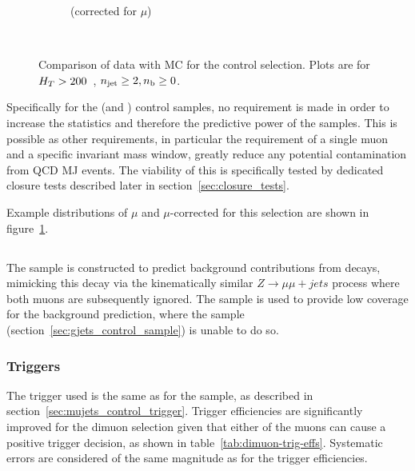 \begin{figure}[t]
\begin{subfigure}[b]{0.48\textwidth}
      \caption{\met (corrected for $\mu$)}
    \end{subfigure} \\
    \caption{\label{fig:datamc_mu_inc}
    Comparison of data with MC for the \mj control selection. Plots 
    are for $H_T>200$~\gev, $n_{\text{jet}}\geq2, n_{\text{b}}\geq0$.
    }
\end{figure}

Specifically for the \mj (and \mmj) control samples, no \alphat requirement is
made in order to increase the statistics and therefore the predictive power of 
the samples. This is possible as other requirements, in particular the 
requirement of
a single muon and a specific invariant mass window, greatly reduce any potential
contamination from QCD MJ events. The viability of this is specifically tested 
by dedicated closure tests described later in section~\ref{sec:closure_tests}.

Example distributions of $\mu$ \Pt and $\mu\text{-corrected}$ \met for this selection
are shown in figure~\ref{fig:datamc_mu_inc}.


\subsection{\mmj}
The \mmj sample is constructed to predict background contributions from \zinv 
decays, mimicking this decay via the kinematically similar $Z\to\mu\mu + jets$
process where both muons are subsequently ignored.
The sample is used to provide low \HT coverage for the \zinv background 
prediction, where the \gj sample (section~\ref{sec:gjets_control_sample})
is unable to do so.

\subsubsection{Triggers}
The trigger used is the same as for the \mj sample, as described in
section~\ref{sec:mujets_control_trigger}. Trigger efficiencies are significantly
improved for the dimuon selection given that either of the muons 
can cause a positive trigger decision, as shown in table~\ref{tab:dimuon-trig-effs}. 
Systematic errors are considered of the same magnitude as for the \mj trigger
efficiencies.

                                       
